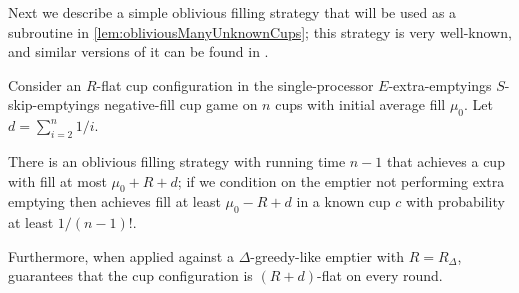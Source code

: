 Next we describe a simple oblivious filling strategy that will be used as a
subroutine in \cref{lem:obliviousManyUnknownCups}; this strategy is very
well-known, and similar versions of it can be found in
\cite{ mbe19, mbe15, die91, wku20}.
\begin{proposition}
  \label{prop:obliviousTerribleProbability}
  Consider an $R$-flat cup configuration in the single-processor
  $E$-extra-emptyings $S$-skip-emptyings negative-fill cup
  game on $n$ cups with initial average fill $\mu_0$.
  Let $d = \sum_{i=2}^n 1/i$.

  There is an oblivious filling strategy  with running
  time $n-1$ that achieves a cup with fill at most $\mu_0 + R +
  d$; if we condition on the emptier not performing extra
  emptying then \randalg achieves fill at least $\mu_0 -R + d$ in
  a known cup $c$ with probability at least $1/(n-1)!$.

  Furthermore, when applied against a $\Delta$-greedy-like emptier
  with $R = R_\Delta$, \randalg guarantees that
  the cup configuration is $(R + d)$-flat on every round.
\end{proposition}
